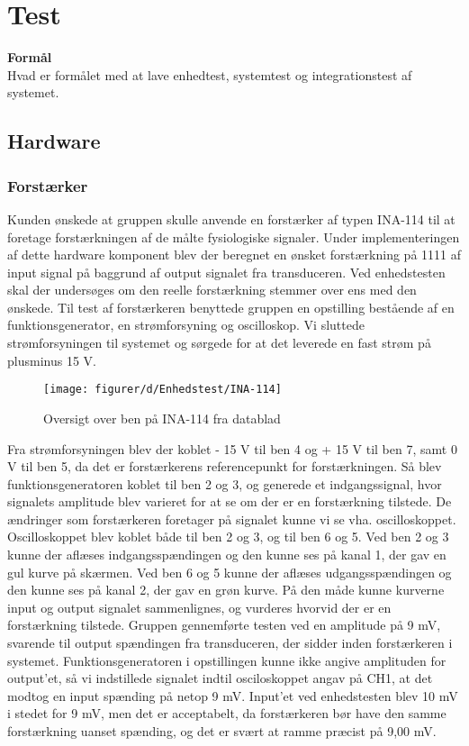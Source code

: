 \chapter{Test}\label{kapEnhedstest}

\textbf{Formål}\\
Hvad er formålet med at lave enhedtest, systemtest og integrationstest af systemet.  

\section{Hardware}
\subsection{Forstærker}

Kunden ønskede at gruppen skulle anvende en forstærker af typen INA-114 til at foretage forstærkningen af de målte fysiologiske signaler. Under implementeringen af dette hardware komponent blev der beregnet en ønsket forstærkning på 1111 af input signal på baggrund af output signalet fra transduceren. 
Ved enhedstesten skal der undersøges om den reelle forstærkning stemmer over ens med den ønskede. 
Til test af forstærkeren benyttede gruppen en opstilling bestående af en funktionsgenerator, en strømforsyning og oscilloskop. 
Vi sluttede strømforsyningen til systemet og sørgede for at det leverede en fast strøm på plusminus 15 V.

\begin{figure}[H]
    \centering
    \texttt{[image: figurer/d/Enhedstest/INA-114]}
   \caption{Oversigt over ben på INA-114 fra datablad}
   \label{figtest_INA-114}
\end{figure}
 
Fra strømforsyningen blev der koblet - 15 V til ben 4 og + 15 V til ben 7, samt 0 V til ben 5, da det er forstærkerens referencepunkt for forstærkningen.
Så blev funktionsgeneratoren koblet til ben 2 og 3, og generede et indgangssignal, hvor signalets amplitude blev varieret for at se om der er en forstærkning tilstede. 
De ændringer som forstærkeren foretager på signalet kunne vi se vha. oscilloskoppet. 
Oscilloskoppet blev koblet både til ben 2 og 3, og til ben 6 og 5. Ved ben 2 og 3 kunne der aflæses indgangsspændingen og den kunne ses på kanal 1, der gav en gul kurve på skærmen. 
Ved ben 6 og 5 kunne der aflæses udgangsspændingen og den kunne ses på kanal 2, der gav en grøn kurve. 
På den måde kunne kurverne input og output signalet sammenlignes, og vurderes hvorvid der er en forstærkning tilstede.
Gruppen gennemførte testen ved en amplitude på 9 mV, svarende til output spændingen fra transduceren, der sidder inden forstærkeren i systemet. 
Funktionsgeneratoren i opstillingen kunne ikke angive amplituden for output'et, så vi indstillede signalet indtil osciloskoppet angav på CH1, at det modtog en input spænding på netop 9 mV. 
Input'et ved enhedstesten blev 10 mV i stedet for 9 mV, men det er acceptabelt, da forstærkeren bør have den samme forstærkning uanset spænding, og det er svært at ramme præcist på 9,00 mV.

